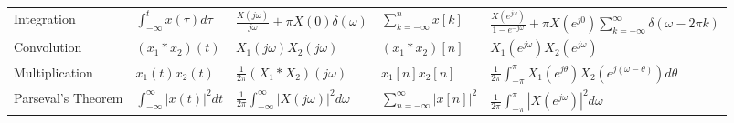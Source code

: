 \documentclass{article}
\begin{document}
\begin{multicols}{2}
\begin{table*}[ht]
\begin{tabular}{@{}lllll@{}}
            Integration        & $\int_{-\infty}^t x(\tau) d\tau$    & $\frac{X(j\omega)}{j\omega} + \pi X(0)\delta(\omega)$         & $\sum_{k=-\infty}^n x[k]$          & $\frac{X(e^{j\omega})}{1-e^{-j\omega}} + \pi X(e^{j0})\sum_{k=-\infty}^{\infty}\delta(\omega - 2\pi k)$ \\ [1mm]
            Convolution        & $(x_1 * x_2)(t)$                    & $X_1(j\omega) X_2(j\omega)$                                   & $(x_1 * x_2)[n]$                   & $X_1(e^{j\omega}) X_2(e^{j\omega})$                                                                     \\ [1mm]
            Multiplication     & $x_1(t)x_2(t)$                      & $\frac{1}{2\pi}(X_1 * X_2)(j\omega)$                          & $x_1[n]x_2[n]$                     & $\frac{1}{2\pi}\int_{-\pi}^{\pi} X_1(e^{j\theta}) X_2(e^{j(\omega-\theta)}) d\theta$                    \\ [1mm]
            Parseval's Theorem & $\int_{-\infty}^\infty |x(t)|^2 dt$ & $\frac{1}{2\pi} \int_{-\infty}^\infty |X(j\omega)|^2 d\omega$ & $\sum_{n=-\infty}^\infty |x[n]|^2$ & $\frac{1}{2\pi} \int_{-\pi}^{\pi} |X(e^{j\omega})|^2 d\omega$                                           \\
            \bottomrule
        \end{tabular}
    \end{table*}


\end{multicols}
\end{document}
